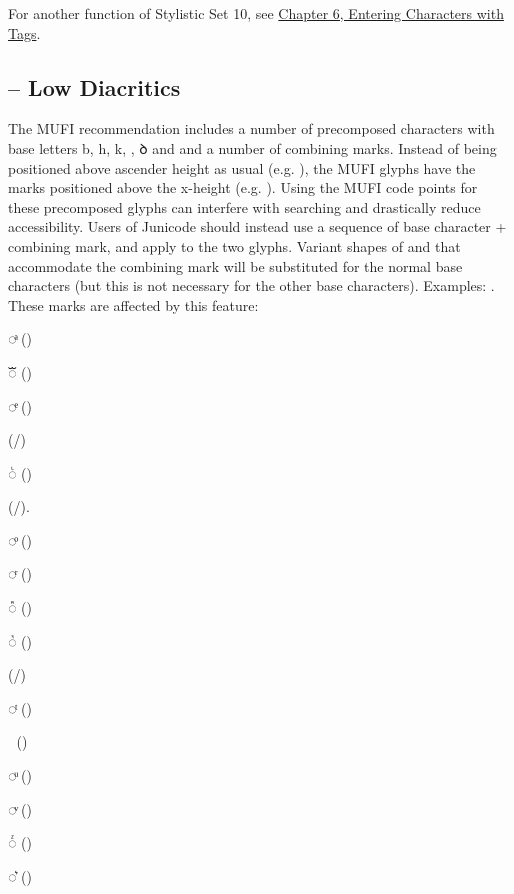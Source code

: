 \noindent For another function of Stylistic Set 10, see
\hyperlink{tagchapter}{Chapter 6, Entering Characters with Tags}.

\subsection{ – Low Diacritics}
The MUFI recommendation includes a number of precomposed characters with base letters
{b, h, k, {\th}, ꝺ and {\dh}} and a number of combining
marks. Instead of being positioned above ascender height as usual (e.g.
), the MUFI glyphs have the marks positioned above the x-height
(e.g. ).
Using the MUFI code points for these precomposed glyphs can interfere with searching
and drastically reduce accessibility. Users of Junicode should instead use a sequence of base character + combining
mark, and apply  to the two glyphs. Variant shapes of  and \textex{{\dh}}
that accommodate the combining mark will be substituted for the normal base characters (but this is not necessary for
the other base characters). Examples:
. These marks are affected by this
feature:

\begin{multicols}{3}
  \jSmCond\color{BrickRed}◌ͣ ()

  ◌ᷓ ()

  ◌ͤ ()

   (\slash{})

  ◌ᷞ ()

   (\slash{}).

  ◌ͦ ()

  ◌ͬ ()

  ◌ᷢ ()

  ◌ᷣ ()

   (\slash{})

  ◌ͭ ()

  ◌ᫎ ()

  ◌ͧ ()

  ◌ͮ ()

  ◌ᷦ ()

  ◌͛ ()
  \end{multicols}

